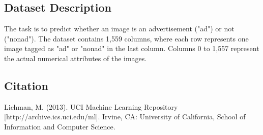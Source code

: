 \documentclass[twoside,final,11pt]{hcmut-report}
\begin{document}
\subsection*{Dataset Description}
The task is to predict whether an image is an advertisement ("ad") or not ("nonad"). The dataset contains 1,559 columns, where each row represents one image tagged as "ad" or "nonad" in the last column. Columns 0 to 1,557 represent the actual numerical attributes of the images.

\subsection*{Citation}
Lichman, M. (2013). UCI Machine Learning Repository [http://archive.ics.uci.edu/ml]. Irvine, CA: University of California, School of Information and Computer Science.

\clearpage



\nocite{*}
\end{document}
